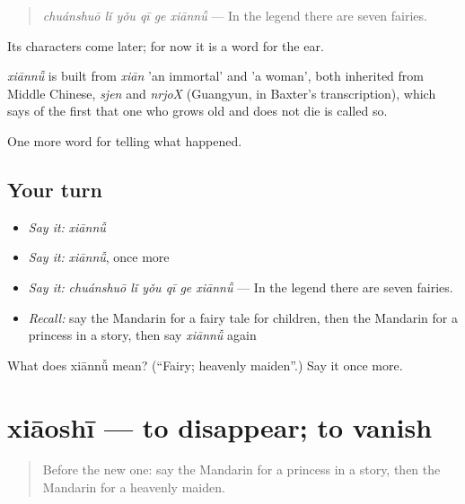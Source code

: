 \begin{quote}
\emph{chuánshuō lǐ yǒu qī ge xiānnǚ} — In the legend there are seven fairies.
\end{quote}

Its characters come later; for now it is a word for the ear.

\begin{cousinweb}
\emph{xiānnǚ} is built from \emph{xiān} 'an immortal' and  'a woman', both inherited from Middle Chinese, \emph{sjen} and \emph{nrjoX} (Guangyun, in Baxter's transcription), which says of the first that one who grows old and does not die is called so.
\end{cousinweb}

\begin{grammarlens}[title={What you've built}]
One more word for telling what happened.
\end{grammarlens}

\subsection*{Your turn}
\begin{itemize}
\raggedright
  \item \emph{Say it:} \emph{xiānnǚ}
  \item \emph{Say it:} \emph{xiānnǚ}, once more
  \item \emph{Say it:} \emph{chuánshuō lǐ yǒu qī ge xiānnǚ} — In the legend there are seven fairies.
  \item \emph{Recall:} say the Mandarin for a fairy tale for children, then the Mandarin for a princess in a story, then say \emph{xiānnǚ} again
\end{itemize}

\begin{tcolorbox}[breakable,colback=teal!4,colframe=teal!35!black,title={Before you move on}]
What does xiānnǚ mean? (\textquotedblleft{}Fairy; heavenly maiden\textquotedblright{}.) Say it once more.
\end{tcolorbox}
\section[xiāoshī]{xiāoshī — to disappear; to vanish}

\label{lesson:ZH-C329-xiaoshi}



\begin{quote}
Before the new one: say the Mandarin for a princess in a story, then the Mandarin for a heavenly maiden.
\end{quote}

